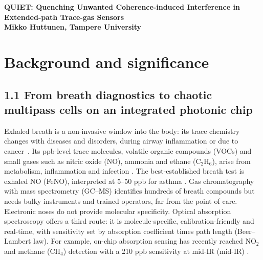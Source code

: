 \documentclass[a4paper,12pt]{article}
\begin{document}
\textbf{\LARGE{QUIET: Quenching Unwanted Coherence-induced Interference in Extended-path Trace-gas Sensors}}\\
\vspace{12pt}%
{\fontsize{14pt}{14pt}\selectfont\textbf{Mikko Huttunen, Tampere University
}}
\vspace{6pt}

\vspace{6pt}

\section{Background and significance} 

\subsection*{1.1 From breath diagnostics to chaotic multipass cells on an integrated photonic chip}

Exhaled breath is a non-invasive window into the body: its trace chemistry changes with diseases and disorders, during airway inflammation or due to cancer~\cite{Dweik2011,Haick2014}. Its ppb-level trace molecules, volatile organic compounds (VOCs) and small gases such as nitric oxide (NO), ammonia and ethane (C$_2$H$_6$), arise from metabolism, inflammation and infection \cite{Haick2014}. The best-established breath test is exhaled NO (FeNO), interpreted at 5--50 ppb for asthma \cite{Dweik2011}.
Gas chromatography with mass spectrometry (GC--MS) identifies hundreds of breath compounds but needs bulky instruments and trained operators, far from the point of care. Electronic noses do not provide molecular specificity. Optical absorption spectroscopy offers a third route: it is molecule-specific, calibration-friendly and real-time, with sensitivity set by absorption coefficient times path length (Beer--Lambert law). For example, on-chip absorption sensing has recently reached NO$_2$ and methane (CH$_4$) detection with a 210 ppb sensitivity at mid-IR (mid-IR) \cite{Fan2026}.
\end{document}
